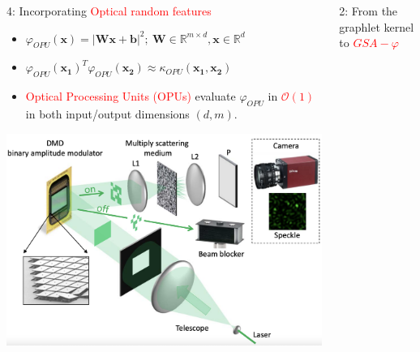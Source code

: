 \documentclass[final,dvipsnames]{beamer}
\newcommand{\vsp}{\vspace{10pt}}
\newcommand{\myemph}[1]{\textcolor{red}{#1}}
\newcommand{\mycolback}[1]{
\hspace*{.01\linewidth}\begin{minipage}{.96\linewidth}
\begin{mdframed}[backgroundcolor=blue!10,linewidth=0pt]
\vsp
#1
\vsp
\end{mdframed}
\end{minipage}
}
\begin{document}
\begin{frame}{}
\begin{columns}[t]
\begin{column}{0.25\linewidth}
\begin{myalertblock}{4: Incorporating \myemph{Optical random features}}
	\vspace{0.3cm}
	\mycolback{
		\begin{itemize}
			\item  ${\varphi}_{OPU}(\mathbf{x})=|\mathbf{Wx+b}|^2 ;~\mathbf{W}\in \mathbb{R}^{m\times d}, \mathbf{x}\in \mathbb{R}^d$
			\vsp
			\item  ${\varphi}_{OPU}(\mathbf{x_1})^T{\varphi}_{OPU}(\mathbf{x_2})\approx \kappa_{OPU}(\mathbf{x_1}, \mathbf{x_2})$
			\vsp
			\item \myemph{Optical Processing Units (OPUs)} evaluate $\varphi_{OPU}$ in \myemph{$\mathcal{O} (1)$} in both input/output dimensions $(d,m)$.
		\end{itemize}
		
	}
  \begin{center}
  \includegraphics[width=0.7\linewidth]{figs/opu}
\end{center}
\end{myalertblock}

\end{column}%




\begin{column}{0.45\linewidth}

\begin{block}{2: From the graphlet kernel to \myemph{$GSA-\varphi$}}
	\hspace*{.0\linewidth}\begin{minipage}{.99\linewidth}
		

\end{minipage}
\end{block}
\end{column}
\end{columns}
\end{frame}
\end{document}
